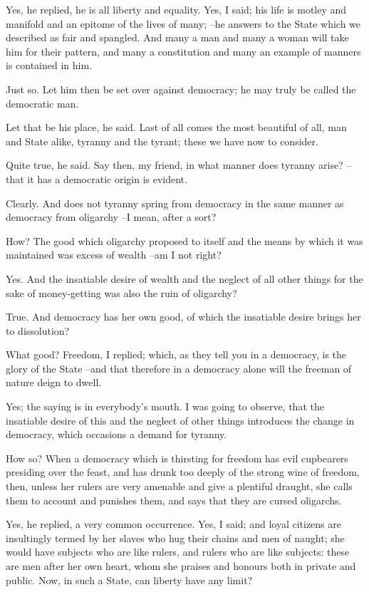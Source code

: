 Yes, he replied, he is all liberty and equality.
Yes, I said; his life is motley and manifold and an epitome of the lives of many; --he answers to the State which we described as fair and spangled. And many a man and many a woman will take him for their pattern, and many a constitution and many an example of manners is contained in him.

Just so.
Let him then be set over against democracy; he may truly be called the democratic man.

Let that be his place, he said.
Last of all comes the most beautiful of all, man and State alike, tyranny and the tyrant; these we have now to consider.

Quite true, he said.
Say then, my friend, in what manner does tyranny arise? --that it has a democratic origin is evident.

Clearly.
And does not tyranny spring from democracy in the same manner as democracy from oligarchy --I mean, after a sort?

How?
The good which oligarchy proposed to itself and the means by which it was maintained was excess of wealth --am I not right?

Yes.
And the insatiable desire of wealth and the neglect of all other things for the sake of money-getting was also the ruin of oligarchy?

True.
And democracy has her own good, of which the insatiable desire brings her to dissolution?

What good?
Freedom, I replied; which, as they tell you in a democracy, is the glory of the State --and that therefore in a democracy alone will the freeman of nature deign to dwell.

Yes; the saying is in everybody's mouth.
I was going to observe, that the insatiable desire of this and the neglect of other things introduces the change in democracy, which occasions a demand for tyranny.

How so?
When a democracy which is thirsting for freedom has evil cupbearers presiding over the feast, and has drunk too deeply of the strong wine of freedom, then, unless her rulers are very amenable and give a plentiful draught, she calls them to account and punishes them, and says that they are cursed oligarchs.

Yes, he replied, a very common occurrence.
Yes, I said; and loyal citizens are insultingly termed by her slaves who hug their chains and men of naught; she would have subjects who are like rulers, and rulers who are like subjects: these are men after her own heart, whom she praises and honours both in private and public. Now, in such a State, can liberty have any limit?

